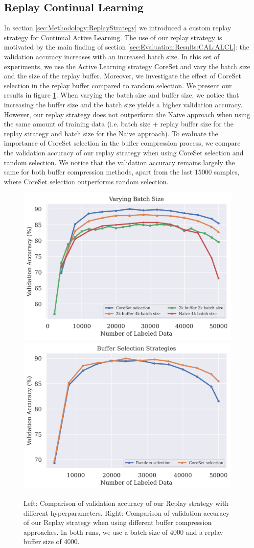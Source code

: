 \subsection{Replay Continual Learning}
\label{sec:Evaluation:Results:CAL:Replay}
In section \ref{sec:Methodology:ReplayStrategy} we introduced a custom replay strategy for Continual Active Learning. The use of our replay strategy is motivated by the main finding of section \ref{sec:Evaluation:Results:CAL:ALCL}: the validation accuracy increases with an
increased batch size. In this set of experiments, we use the Active Learning strategy CoreSet and vary the batch size and the size of the replay buffer. Moreover, we investigate the effect of CoreSet selection in the replay buffer compared to random selection. We present our
results in figure \ref{fig:Evaluation:Results:CAL:Replay}. When varying the batch size and buffer size, we notice that increasing the buffer size and the batch size yields a higher validation accuracy. However, our replay strategy does not outperform the Naive approach when using
the same amount of training data (i.e. batch size + replay buffer size for the replay strategy and batch size for the Naive approach). To evaluate the importance of CoreSet selection in the buffer compression process, we compare the validation accuracy of our replay strategy
when using CoreSet selection and random selection. We notice that the validation accuracy remains largely the same for both buffer compression methods, apart from the last 15000 samples, where CoreSet selection outperforms random selection. \par

\begin{figure}[h]
    \centering
    \includegraphics[width=0.45\linewidth]{images/results_CAL/replay_varying_batch_size.png} \hfill
    \includegraphics[width=0.45\linewidth]{images/results_CAL/replay_buffer_selection.png}
    \caption[Continual Active Learning Custom Replay strategy]{Left: Comparison of validation accuracy of our Replay strategy with different hyperparameters. Right: Comparison of validation accuracy of our Replay strategy when using different buffer compression approaches.
    In both runs, we use a batch size of 4000 and a replay buffer size of 4000.}
    \label{fig:Evaluation:Results:CAL:Replay}
\end{figure}

